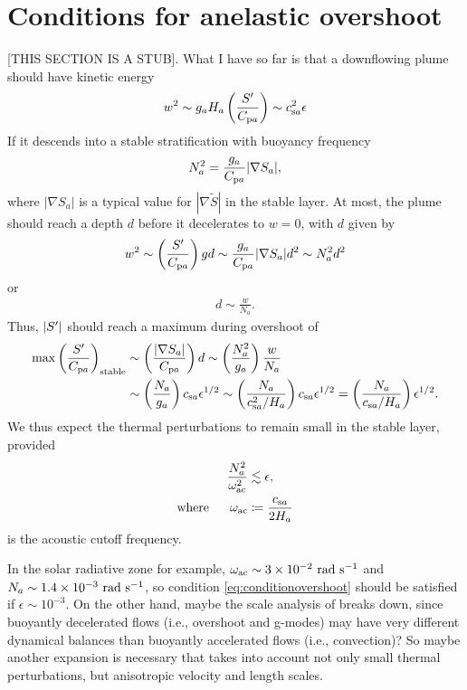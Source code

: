 \documentclass[12pt]{article}
\newcommand{\csa}{c_{{\rm s}a}}
\newcommand{\cpa}{C_{{\rm p}a}}
\begin{document}

\section{Conditions for anelastic overshoot}
[THIS SECTION IS A STUB]. What I have so far is that a downflowing plume should have kinetic energy 
\begin{align}
	w^2 \sim g_a H_a \left(\frac{\entrprime}{\cpa}\right) \sim \csa^2 \epsilon
\end{align}
If it descends into a stable stratification with buoyancy frequency
\begin{align}
	N_a^2 =   \frac{g_a}{\cpa}|\nabla S_a|,
\end{align}
where $|\nabla S_a|$ is a typical value for $|\nabla\tilde{S}|$ in the stable layer. At most, the plume should reach a depth $d$ before it decelerates to $w=0$, with $d$ given by
\begin{align}
	w^2 \sim \left(\frac{\entrprime}{\cpa}\right)gd \sim \frac{g_a}{\cpa}|\nabla S_a| d^2 \sim N_a^2 d^2
\end{align}
or 
\begin{align}
	d\sim \frac{w}{N_a}. 
\end{align}
Thus, $|S^\prime|$ should reach a maximum during overshoot of 
\begin{align}
	\max{\left(\frac{\entrprime}{\cpa}\right)_{\rm stable}} &\sim \left(\frac{|\nabla S_a|}{\cpa}\right)d \sim \left(\frac{N_a^2}{g_a}\right)\frac{w}{N_a}\nonumber\\
	&\sim \left(\frac{N_a}{g_a}\right)\csa \epsilon^{1/2}\sim \left(\frac{N_a}{\csa^2/H_a}\right)\csa \epsilon^{1/2} = \left(\frac{N_a}{\csa/H_a}\right)\epsilon^{1/2}.
\end{align}
We thus expect the thermal perturbations to remain small in the stable layer, provided 
\begin{subequations}
\begin{align}
	\frac{N_a^2}{\omega_{\rm ac}^2} &\lesssim \epsilon,\label{eq:conditionovershoot}\\
	\where \omega_{\rm ac} &\define \frac{\csa}{2H_a}
\end{align}
\end{subequations}
is the acoustic cutoff frequency. 

In the solar radiative zone for example, $\omega_{\rm ac}\sim\sn{3}{-2}\ \rm rad\ s^{-1}$ and $N_a\sim 1.4\times10^{-3}\ \rm rad\ s^{-1}$, so condition \eqref{eq:conditionovershoot} should be satisfied if $\epsilon \sim 10^{-3}$. On the other hand, maybe the scale analysis of \citet{Gough1969} breaks down, since buoyantly decelerated flows (i.e., overshoot and g-modes) may have very different dynamical balances than buoyantly accelerated flows (i.e., convection)? So maybe another expansion is necessary that takes into account not only small thermal perturbations, but anisotropic velocity and length scales. 
\end{document}
